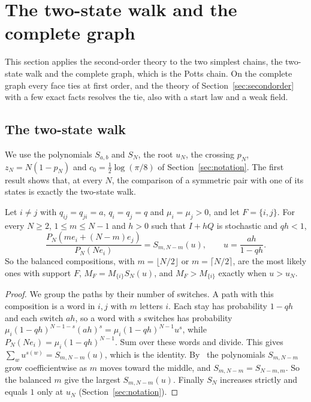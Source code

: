 \section{The two-state walk and the complete graph}\label{sec:complete}

This section applies the second-order theory to the two simplest chains, the two-state walk
and the complete graph, which is the Potts chain. On the complete graph every face ties at
first order, and the theory of Section~\ref{sec:secondorder} with a few exact facts resolves
the tie, also with a start law and a weak field.

\subsection{The two-state walk}\label{sec:papersAB}

We use the polynomials $S_{a,b}$ and $S_N$, the root $u_N$, the crossing $p_N$,
$z_N=N(1-p_N)$ and $c_0=\frac12\log(\pi/8)$ of Section~\ref{sec:notation}. The
first result shows that, at every $N$, the comparison of a symmetric pair with
one of its states is exactly the two-state walk.

\begin{proposition}\label{prop:pair}
Let $i\ne j$ with $q_{ij}=q_{ji}=a$, $q_i=q_j=q$ and $\mu_i=\mu_j>0$, and let
$F=\{i,j\}$. For every $N\ge2$, $1\le m\le N-1$ and $h>0$ such that $I+hQ$ is
stochastic and $qh<1$,
\[
\frac{P_N(me_i+(N-m)e_j)}{P_N(Ne_i)}=S_{m,N-m}(u),\qquad u=\frac{ah}{1-qh}.
\]
So the balanced compositions, with $m=\lfloor N/2\rfloor$ or
$m=\lceil N/2\rceil$, are the most likely ones with support $F$,
$M_F=M_{\{i\}}S_N(u)$, and $M_F>M_{\{i\}}$ exactly when $u>u_N$.
\end{proposition}

\begin{proof}
We group the paths by their number of switches.
A path with this composition is a word in $i,j$ with $m$ letters $i$. Each stay has probability
$1-qh$ and each switch $ah$, so a word with $s$ switches has probability
$\mu_i(1-qh)^{N-1-s}(ah)^s=\mu_i(1-qh)^{N-1}u^s$, while $P_N(Ne_i)=\mu_i(1-qh)^{N-1}$. Sum over
these words and divide. This gives $\sum_wu^{s(w)}=S_{m,N-m}(u)$, which is the identity.
By~\cite[Proposition~4.1]{paperA} the polynomials $S_{m,N-m}$ grow coefficientwise as $m$ moves toward the
middle, and $S_{m,N-m}=S_{N-m,m}$. So the balanced $m$ give the largest $S_{m,N-m}(u)$. Finally
$S_N$ increases strictly and equals $1$ only at $u_N$ (Section~\ref{sec:notation}).
\end{proof}

